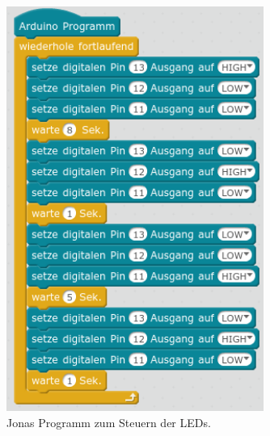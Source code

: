 \vspace{-0.75\baselineskip}
\begin{figure}[H]
	\begin{minipage}{0.48\textwidth}
		\centering
		\includegraphics[width=0.75\textwidth]{pics/ampel-ohne-variablen.png}
		\caption{Jonas Programm zum Steuern der LEDs.}
	\end{minipage}
	\hfill
	\begin{minipage}{0.48\textwidth}
		\centering

\end{minipage}
\end{figure}
